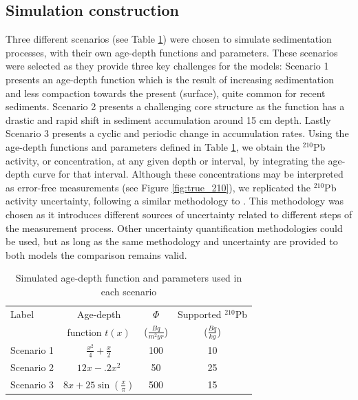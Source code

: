 \documentclass [10pt] {article}
\begin{document}
\subsection{Simulation construction}\label{sec:SimConst}

Three different scenarios (see Table \ref{tab:sim_param}) were chosen to simulate sedimentation processes, with their own age-depth functions and parameters. 
These scenarios were selected as they provide three key challenges for the models: 
Scenario 1 presents an age-depth function which is the result of increasing sedimentation and less compaction towards the present (surface), quite common for recent sediments. 
Scenario 2 presents a challenging core structure as the function has a drastic and rapid shift in sediment accumulation around 15 cm depth. Lastly Scenario 3 presents a cyclic and periodic change in accumulation rates. 
Using the age-depth functions and parameters defined in Table \ref{tab:sim_param}, we obtain the $^{210}$Pb activity, or concentration, at any given depth or interval, by integrating the age-depth curve for that interval.  
Although these concentrations may be interpreted as error-free measurements 
(see Figure \ref{fig:true_210}), we replicated the $^{210}$Pb activity uncertainty, following a similar methodology to \citet{Blaauw2018}.
This methodology was chosen as it introduces different sources of uncertainty related to different steps of the measurement process.
Other uncertainty quantification methodologies could be used, but as long as the same methodology and uncertainty are provided to both models the comparison remains valid.
\begin{table}[!h]
	\centering
	\begin{tabular}{l|ccc}
Label    	& 	Age-depth		&	$ \Phi$		& Supported $^{210}$Pb  \\
		&	function $t(x)$		&	($\frac{Bq}{m^2yr }$)	& ($\frac{Bq}{kg}$) 	\\ \hline
Scenario 1 	&	$\frac{x^2}{4} + \frac{x}{2}$	&	100	& 10	\\
Scenario 2 	&	$12x -.2x^2$			&	50	& 25	\\
Scenario 3 	&	$8x+25\sin(\frac{x}{\pi})$	&	500 	& 15		
	\end{tabular}
	\label{tab:sim_param}
	\caption{Simulated age-depth function and parameters used in each scenario}
 \end{table}
\end{document}
